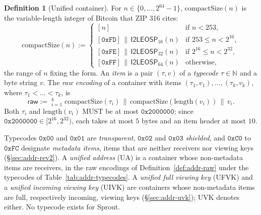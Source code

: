 \documentclass[11pt,a4paper]{article}
\theoremstyle{definition}
\newtheorem{definition}[theorem]{Definition}
\newcommand{\N}{\mathbb{N}}
\begin{document}
\begin{definition}[Unified container]\label{def:addr-container}
For $n \in \{0, \dots, 2^{64} - 1\}$, $\mathrm{compactSize}(n)$ is the
variable-length integer of Bitcoin that ZIP 316 cites:
\[
  \mathrm{compactSize}(n) :=
  \begin{cases}
    [n] & \text{if } n < 253, \\
    [\mathtt{0xFD}] \,\|\, \mathsf{I2LEOSP}_{16}(n) & \text{if }
      253 \le n < 2^{16}, \\
    [\mathtt{0xFE}] \,\|\, \mathsf{I2LEOSP}_{32}(n) & \text{if }
      2^{16} \le n < 2^{32}, \\
    [\mathtt{0xFF}] \,\|\, \mathsf{I2LEOSP}_{64}(n) & \text{otherwise},
  \end{cases}
\]
the range of $n$ fixing the form. An \emph{item} is a pair $(\tau, v)$ of a
\emph{typecode} $\tau \in \N$ and a byte string $v$. The \emph{raw encoding}
of a container with items $(\tau_1, v_1), \dots, (\tau_k, v_k)$, where
$\tau_1 < \dots < \tau_k$, is
\[
  \mathsf{raw} := \mathop{\big\|}_{i=1}^{k} \mathrm{compactSize}(\tau_i)
    \,\|\, \mathrm{compactSize}(\mathrm{length}(v_i)) \,\|\, v_i .
\]
Both $\tau_i$ and $\mathrm{length}(v_i)$ MUST be at most
$\mathtt{0x2000000}$; since $\mathtt{0x2000000} \in [2^{16}, 2^{32})$, each
takes at most $5$ bytes and an item header at most $10$.

Typecodes $\mathtt{0x00}$ and $\mathtt{0x01}$ are \emph{transparent},
$\mathtt{0x02}$ and $\mathtt{0x03}$ \emph{shielded}, and $\mathtt{0xC0}$ to
$\mathtt{0xFC}$ designate \emph{metadata items}, items that are neither
receivers nor viewing keys (\S\ref{sec:addr-rev2}). A \emph{unified address}
(UA) is a container whose non-metadata items are receivers, in the raw
encodings of Definition~\ref{def:addr-raw} under the typecodes of
Table~\ref{tab:addr-typecodes}. A \emph{unified full viewing key} (UFVK) and
a \emph{unified incoming viewing key} (UIVK) are containers whose
non-metadata items are full, respectively incoming, viewing keys
(\S\ref{sec:addr-uvk}); UVK denotes either. No typecode exists for Sprout.


\end{definition}
\end{document}
